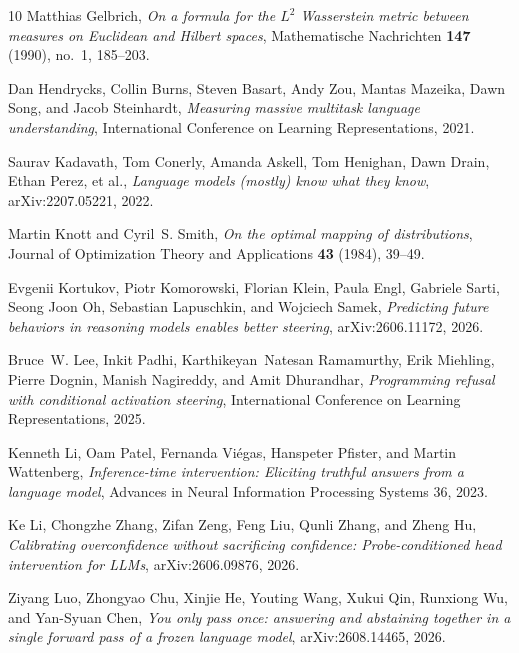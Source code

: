 \begin{thebibliography}{10}
Matthias Gelbrich, \emph{On a formula for the $L^2$ Wasserstein metric between
  measures on Euclidean and Hilbert spaces}, Mathematische Nachrichten
  \textbf{147} (1990), no.~1, 185--203.

Dan Hendrycks, Collin Burns, Steven Basart, Andy Zou, Mantas Mazeika, Dawn Song,
  and Jacob Steinhardt, \emph{Measuring massive multitask language
  understanding}, International Conference on Learning Representations, 2021.

Saurav Kadavath, Tom Conerly, Amanda Askell, Tom Henighan, Dawn Drain, Ethan
  Perez, et al., \emph{Language models (mostly) know what they know},
  arXiv:2207.05221, 2022.

Martin Knott and Cyril~S. Smith, \emph{On the optimal mapping of distributions},
  Journal of Optimization Theory and Applications \textbf{43} (1984), 39--49.

Evgenii Kortukov, Piotr Komorowski, Florian Klein, Paula Engl, Gabriele Sarti,
  Seong Joon Oh, Sebastian Lapuschkin, and Wojciech Samek, \emph{Predicting
  future behaviors in reasoning models enables better steering},
  arXiv:2606.11172, 2026.

Bruce~W. Lee, Inkit Padhi, Karthikeyan~Natesan Ramamurthy, Erik Miehling,
  Pierre Dognin, Manish Nagireddy, and Amit Dhurandhar, \emph{Programming
  refusal with conditional activation steering}, International Conference on
  Learning Representations, 2025.

Kenneth Li, Oam Patel, Fernanda Vi\'egas, Hanspeter Pfister, and Martin
  Wattenberg, \emph{Inference-time intervention: Eliciting truthful answers from
  a language model}, Advances in Neural Information Processing Systems 36, 2023.

Ke Li, Chongzhe Zhang, Zifan Zeng, Feng Liu, Qunli Zhang, and Zheng Hu,
  \emph{Calibrating overconfidence without sacrificing confidence:
  Probe-conditioned head intervention for LLMs}, arXiv:2606.09876, 2026.

Ziyang Luo, Zhongyao Chu, Xinjie He, Youting Wang, Xukui Qin, Runxiong Wu, and
  Yan-Syuan Chen, \emph{You only pass once: answering and abstaining together
  in a single forward pass of a frozen language model}, arXiv:2608.14465, 2026.


\end{thebibliography}
